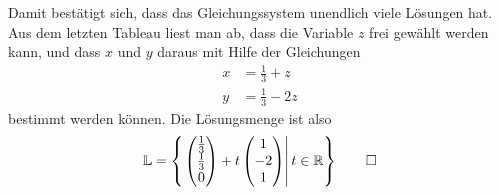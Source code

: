 \begin{loesung}
Damit bestätigt sich, dass das Gleichungssystem unendlich viele Lösungen
hat.
Aus dem letzten Tableau liest man ab, dass die Variable $z$ frei gewählt
werden kann, und dass $x$ und $y$ daraus mit Hilfe der Gleichungen
\begin{align*}
x&=\frac13+z\\
y&=\frac13-2z
\end{align*}
bestimmt werden können.
Die Lösungsmenge ist also
\[
\mathbb L =\left\{\left.
\begin{pmatrix}\frac13\\\frac13\\0\end{pmatrix}
+
t\begin{pmatrix}1\\-2\\1\end{pmatrix}
\right| t\in\mathbb R
\right\}
\qedhere
\]
\end{loesung}


